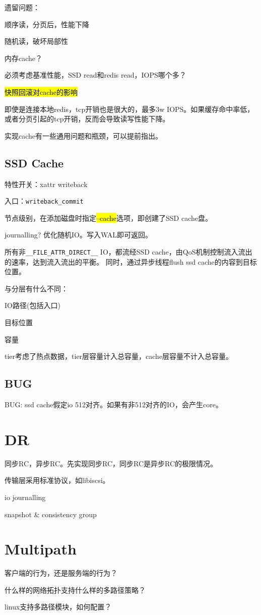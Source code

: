 遗留问题：
\begin{enumbox}
\item 顺序读，分页后，性能下降
\item 随机读，破坏局部性
\item 内存cache？
\item 必须考虑基准性能，SSD read和redis read，IOPS哪个多？
\item \hl{快照回滚对cache的影响}
\end{enumbox}

即使是连接本地redis，tcp开销也是很大的，最多3w IOPS。如果缓存命中率低，或者分页引起的tcp开销，反而会导致读写性能下降。

实现cache有一些通用问题和瓶颈，可以提前指出。

\subsection{SSD Cache}

特性开关：xattr writeback

入口：\verb|writeback_commit|

节点级别，在添加磁盘时指定\hl{--cache}选项，即创建了SSD cache盘。

journalling? 优化随机IO。写入WAL即可返回。

所有非\verb|__FILE_ATTR_DIRECT__| IO，都流经SSD cache，由QoS机制控制流入流出的速率，达到流入流出的平衡。
同时，通过异步线程flush ssd cache的内容到目标位置。

与分层有什么不同：
\begin{compactitem}
\item IO路径(包括入口)
\item 目标位置
\item 容量
\end{compactitem}

tier考虑了热点数据，tier层容量计入总容量，cache层容量不计入总容量。

\subsection{BUG}

BUG: ssd cache假定io 512对齐。如果有非512对齐的IO，会产生core。

\section{DR}

同步RC，异步RC。先实现同步RC，同步RC是异步RC的极限情况。

传输层采用标准协议，如libiscsi。

io journalling

snapshot \& consistency group


\section{Multipath}

\begin{enumbox}
\item 客户端的行为，还是服务端的行为？
\item 什么样的网络拓扑支持什么样的多路径策略？
\item linux支持多路径模块，如何配置？
\end{enumbox}
